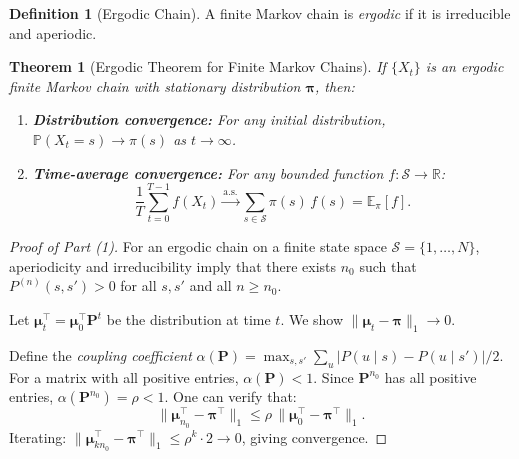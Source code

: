 \documentclass[11pt,a4paper]{article}
\theoremstyle{definition}
\newtheorem{definition}{Definition}[section]
\theoremstyle{plain}
\newtheorem{theorem}{Theorem}[section]
\theoremstyle{remark}
\newcommand{\E}{\mathbb{E}}
\newcommand{\R}{\mathbb{R}}
\newcommand{\Prob}{\mathbb{P}}
\newcommand{\cas}{\xrightarrow{\text{a.s.}}}
\begin{document}
\begin{definition}[Ergodic Chain]
\label{def:ergodic}
A finite Markov chain is \emph{ergodic} if it is irreducible and aperiodic.
\end{definition}

\begin{keyresult}
\begin{theorem}[Ergodic Theorem for Finite Markov Chains]
\label{thm:ergodic}
If $\{X_t\}$ is an ergodic finite Markov chain with stationary distribution $\boldsymbol{\pi}$, then:
\begin{enumerate}[nosep]
    \item \textbf{Distribution convergence:} For any initial distribution, $\Prob(X_t = s) \to \pi(s)$ as $t \to \infty$.
    \item \textbf{Time-average convergence:} For any bounded function $f: \mathcal{S} \to \R$:
    \begin{equation}
        \frac{1}{T}\sum_{t=0}^{T-1} f(X_t) \cas \sum_{s \in \mathcal{S}} \pi(s)\, f(s) = \E_\pi[f].
        \label{eq:ergodic}
    \end{equation}
\end{enumerate}
\end{theorem}
\end{keyresult}

\begin{proof}[Proof of Part (1)]
For an ergodic chain on a finite state space $\mathcal{S} = \{1, \ldots, N\}$, aperiodicity and irreducibility imply that there exists $n_0$ such that $P^{(n)}(s, s') > 0$ for all $s, s'$ and all $n \geq n_0$.

Let $\boldsymbol{\mu}_t^\top = \boldsymbol{\mu}_0^\top \mathbf{P}^t$ be the distribution at time $t$. We show $\|\boldsymbol{\mu}_t - \boldsymbol{\pi}\|_1 \to 0$.

Define the \emph{coupling coefficient} $\alpha(\mathbf{P}) = \max_{s, s'} \sum_u |P(u \mid s) - P(u \mid s')|/2$. For a matrix with all positive entries, $\alpha(\mathbf{P}) < 1$. Since $\mathbf{P}^{n_0}$ has all positive entries, $\alpha(\mathbf{P}^{n_0}) = \rho < 1$. One can verify that:
\begin{equation}
    \|\boldsymbol{\mu}_{n_0}^\top - \boldsymbol{\pi}^\top\|_1 \leq \rho\, \|\boldsymbol{\mu}_0^\top - \boldsymbol{\pi}^\top\|_1.
\end{equation}
Iterating: $\|\boldsymbol{\mu}_{kn_0}^\top - \boldsymbol{\pi}^\top\|_1 \leq \rho^k \cdot 2 \to 0$, giving convergence.
\end{proof}
\end{document}
